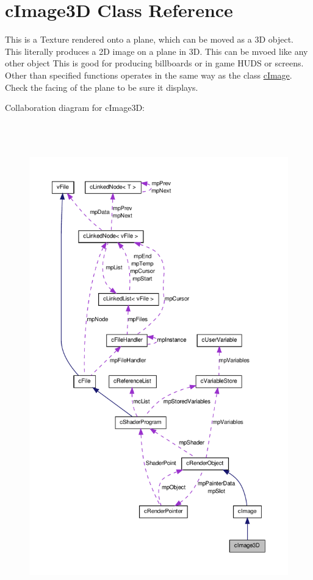 \hypertarget{classc_image3_d}{
\section{cImage3D Class Reference}
\label{classc_image3_d}
}


This is a Texture rendered onto a plane, which can be moved as a 3D object. This literally produces a 2D image on a plane in 3D. This can be mvoed like any other object This is good for producing billboards or in game HUDS or screens. Other than specified functions operates in the same way as the class \hyperlink{classc_image}{cImage}. Check the facing of the plane to be sure it displays.  




Collaboration diagram for cImage3D:\nopagebreak
\begin{figure}[H]
\begin{center}
\leavevmode
\includegraphics[height=600pt]{classc_image3_d__coll__graph}
\end{center}
\end{figure}


